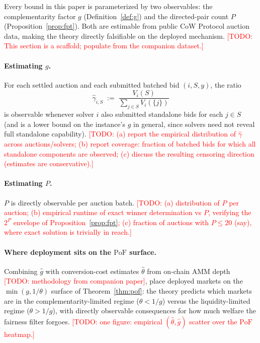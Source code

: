 \documentclass[11pt]{article}
\newcommand{\todo}[1]{\textcolor{red}{[TODO: #1]}}
\theoremstyle{remark}
\newcommand{\PoF}{\mathrm{PoF}}
\begin{document}
Every bound in this paper is parameterized by two observables: the
complementarity factor $g$ (Definition~\ref{def:g}) and the directed-pair
count $P$ (Proposition~\ref{prop:fpt}). Both are estimable from public CoW
Protocol auction data, making the theory directly falsifiable on the
deployed mechanism. \todo{This section is a scaffold; populate from the
companion dataset.}

\paragraph{Estimating $g$.}
For each settled auction and each submitted batched bid $(i,S,y)$, the
ratio
\[
\widehat\gamma_{i,S}\;:=\;\frac{V_i(S)}{\sum_{j\in S}V_i(\{j\})}
\]
is observable whenever solver $i$ also submitted standalone bids for each
$j\in S$ (and is a lower bound on the instance's $g$ in general, since
solvers need not reveal full standalone capability). \todo{(a) report the
empirical distribution of $\widehat\gamma$ across auctions/solvers; (b)
report coverage: fraction of batched bids for which all standalone
components are observed; (c) discuss the resulting censoring direction
(estimates are conservative).}

\paragraph{Estimating $P$.}
$P$ is directly observable per auction batch. \todo{(a) distribution of $P$
per auction; (b) empirical runtime of exact winner determination vs $P$,
verifying the $2^P$ envelope of Proposition~\ref{prop:fpt}; (c) fraction of
auctions with $P\le 20$ (say), where exact solution is trivially in reach.}

\paragraph{Where deployment sits on the $\PoF$ surface.}
Combining $\widehat g$ with conversion-cost estimates $\widehat\theta$ from
on-chain AMM depth \todo{methodology from companion paper}, place deployed
markets on the $\min(g,1/\theta)$ surface of Theorem~\ref{thm:pof}: the
theory predicts which markets are in the complementarity-limited regime
($\theta<1/g$) versus the liquidity-limited regime ($\theta>1/g$), with
directly observable consequences for how much welfare the fairness filter
forgoes. \todo{one figure: empirical $(\widehat\theta,\widehat g)$ scatter
over the $\PoF$ heatmap.}

\end{document}
